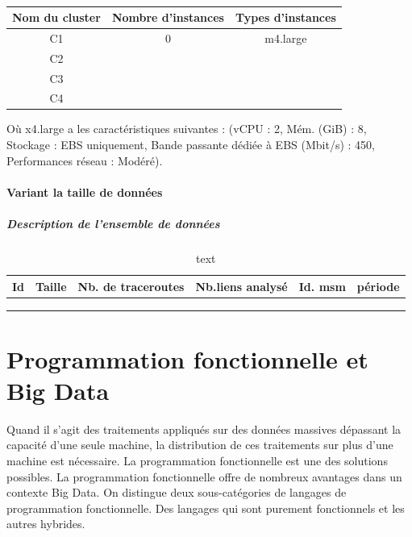 \begin{table}[H]
	\centering
	\begin{tabular}{|c|c|c|}
	\hline 
\textbf{Nom du cluster}	&\textbf{Nombre d'instances}	&  \textbf{Types d'instances}   \\ 
	\hline 
C1	&   0 &  m4.large  \\ 
	\hline 
C2	&  &  \\ 
	\hline 
C3	&  &  \\ 
	\hline 
C4	&  &  \\ 
	\hline 
\end{tabular} 
\caption{}
\label{clusters-description}
\end{table}

Où x4.large a les caractéristiques suivantes : (vCPU : 2, Mém. (GiB) : 8, Stockage : EBS uniquement, Bande passante dédiée à EBS (Mbit/s) : 450, Performances réseau : Modéré).

\paragraph{Variant la taille de données}

\subparagraph{Description de l'ensemble de données}
\begin{table}[H]
	\centering
	\begin{tabular}{|c|c|c|c|c|c|}
		\hline 
		Id	& Taille  & Nb. de traceroutes & Nb.liens analysé & Id. msm& période \\ 
		\hline 
		&  &  &  & & \\ 
		\hline 
		&  &  &  & & \\ 
		\hline 
		&  &  &  & & \\ 
		\hline 
	\end{tabular} 
\caption{text}
\label{key}
\end{table}

\section{Programmation fonctionnelle et Big Data}

 Quand il s'agit des traitements appliqués sur des données massives dépassant la capacité d'une seule machine, la distribution de ces traitements sur plus d'une machine  est nécessaire. La programmation fonctionnelle est une  des solutions possibles. La programmation fonctionnelle offre de nombreux avantages dans un contexte Big Data.
On distingue deux sous-catégories de langages de programmation fonctionnelle. Des langages qui sont purement fonctionnels et les autres hybrides.

